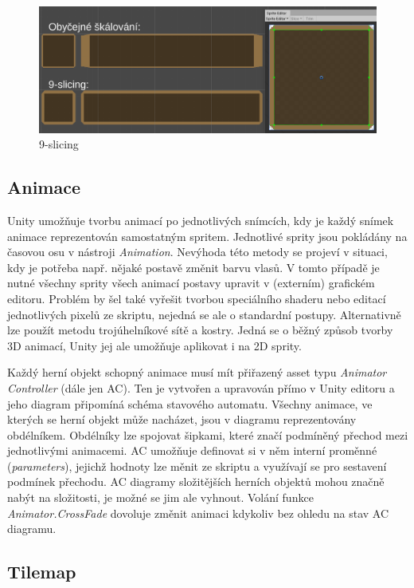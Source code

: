 \documentclass[FM,Proj,bw]{tulthesis}
\begin{document}
	\begin{figure}[ht]
		\centering
		\includegraphics[width=\textwidth]{img/9Slicing}
		\caption{9-slicing}
		\label{img9Slicing}
	\end{figure}
	
	\subsection{Animace}
	
	Unity umožňuje tvorbu animací po jednotlivých snímcích, kdy je každý snímek animace reprezentován samostatným spritem. Jednotlivé sprity jsou pokládány na časovou osu v nástroji \textit{Animation}. Nevýhoda této metody se projeví v situaci, kdy je potřeba např. nějaké postavě změnit barvu vlasů. V tomto případě je nutné všechny sprity všech animací postavy upravit v (externím) grafickém editoru. Problém by šel také vyřešit tvorbou speciálního shaderu nebo editací jednotlivých pixelů ze skriptu, nejedná se ale o standardní postupy. Alternativně lze použít metodu trojúhelníkové sítě a kostry. Jedná se o běžný způsob tvorby 3D animací, Unity jej ale umožňuje aplikovat i na 2D sprity.
	
	Každý herní objekt schopný animace musí mít přiřazený asset typu \textit{Animator Controller} (dále jen AC). Ten je vytvořen a upravován přímo v Unity editoru a jeho diagram připomíná schéma stavového automatu. Všechny animace, ve kterých se herní objekt může nacházet, jsou v diagramu reprezentovány obdélníkem. Obdélníky lze spojovat šipkami, které značí podmíněný přechod mezi jednotlivými animacemi. AC umožňuje definovat si v něm interní proměnné (\textit{parameters}), jejichž hodnoty lze měnit ze skriptu a využívají se pro sestavení podmínek přechodu. AC diagramy složitějších herních objektů mohou značně nabýt na složitosti, je možné se jim ale vyhnout. Volání funkce \textit{Animator.CrossFade} dovoluje změnit animaci kdykoliv bez ohledu na stav AC diagramu.
	
	\subsection{Tilemap}
	
\end{document}
